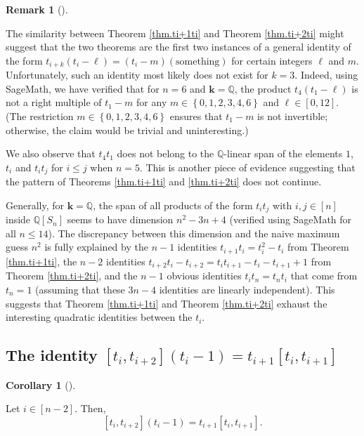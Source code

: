 \documentclass[numbers=enddot,12pt,final,onecolumn,notitlepage]{scrartcl}%
\theoremstyle{definition}
\newtheorem{remk}[theo]{Remark}
\newenvironment{remark}[1][]
{\begin{remk}[#1]\begin{leftbar}}
{\end{leftbar}\end{remk}}
\newtheorem{coro}[theo]{Corollary}
\newenvironment{corollary}[1][]
{\begin{coro}[#1]\begin{leftbar}}
{\end{leftbar}\end{coro}}
\begin{document}
\begin{remark}
\label{rmk.ti+kti}The similarity between Theorem \ref{thm.ti+1ti} and Theorem
\ref{thm.ti+2ti} might suggest that the two theorems are the first two
instances of a general identity of the form $t_{i+k}\left(  t_{i}-\ell\right)
=\left(  t_{i}-m\right)  \left(  \text{something}\right)  $ for certain
integers $\ell$ and $m$. Unfortunately, such an identity most likely does not
exist for $k=3$. Indeed, using SageMath, we have verified that for $n=6$ and
$\mathbf{k}=\mathbb{Q}$, the product $t_{4}\left(  t_{1}-\ell\right)  $ is not
a right multiple of $t_{1}-m$ for any $m\in\left\{  0,1,2,3,4,6\right\}  $ and
$\ell\in\left[  0,12\right]  $. (The restriction $m\in\left\{
0,1,2,3,4,6\right\}  $ ensures that $t_{1}-m$ is not invertible; otherwise,
the claim would be trivial and uninteresting.)

We also observe that $t_{4}t_{1}$ does not belong to the $\mathbb{Q}$-linear
span of the elements $1$, $t_{i}$ and $t_{i}t_{j}$ for $i\leq j$ when $n=5$.
This is another piece of evidence suggesting that the pattern of Theorems
\ref{thm.ti+1ti} and \ref{thm.ti+2ti} does not continue.

Generally, for $\mathbf{k}=\mathbb{Q}$, the span of all products of the form
$t_{i}t_{j}$ with $i,j\in\left[  n\right]  $ inside $\mathbb{Q}\left[
S_{n}\right]  $ seems to have dimension $n^{2}-3n+4$ (verified using SageMath
for all $n\leq14$). The discrepancy between this dimension and the naive
maximum guess $n^{2}$ is fully explained by the $n-1$ identities $t_{i+1}%
t_{i}=t_{i}^{2}-t_{i}$ from Theorem \ref{thm.ti+1ti}, the $n-2$ identities
$t_{i+2}t_{i}-t_{i+2}=t_{i}t_{i+1}-t_{i}-t_{i+1}+1$ from Theorem
\ref{thm.ti+2ti}, and the $n-1$ obvious identities $t_{i}t_{n}=t_{n}t_{i}$
that come from $t_{n}=1$ (assuming that these $3n-4$ identities are linearly
independent). This suggests that Theorem \ref{thm.ti+1ti} and Theorem
\ref{thm.ti+2ti} exhaust the interesting quadratic identities between the
$t_{i}$.
\end{remark}

\subsection{The identity $\left[  t_{i},t_{i+2}\right]  \left(  t_{i}%
-1\right)  =t_{i+1}\left[  t_{i},t_{i+1}\right]  $}

\begin{corollary}
\label{cor.titi+2ti-1}Let $i\in\left[  n-2\right]  $. Then,%
\[
\left[  t_{i},t_{i+2}\right]  \left(  t_{i}-1\right)  =t_{i+1}\left[
t_{i},t_{i+1}\right]  .
\]

\end{corollary}
\end{document}
